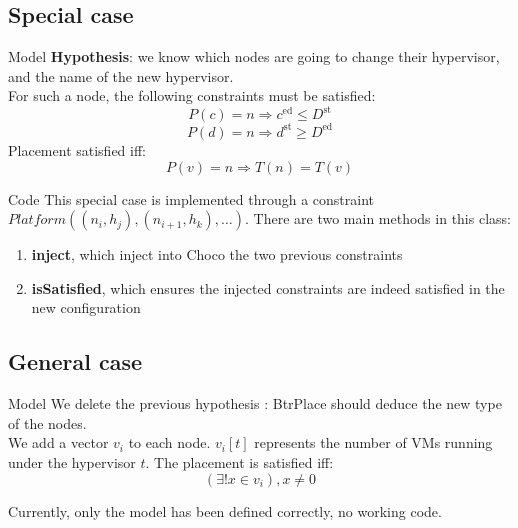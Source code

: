 \documentclass{beamer}
\begin{document}
\subsection{Special case}
\begin{frame}{Model}
\textbf{Hypothesis}: we know which nodes are going to change their hypervisor,
and the name of the new hypervisor.\\
\pause For such a node, the following constraints must be satisfied:
\[
	P(c) = n \Rightarrow c^\mathrm{ed} \leq D^\mathrm{st}
\]
\[
	P(d) = n \Rightarrow d^\mathrm{st} \geq D^\mathrm{ed}
\]
\pause Placement satisfied iff:
\[
	P(v) = n \Rightarrow T(n) = T(v)	
\]

\end{frame}
\begin{frame}{Code}
This special case is implemented through a constraint
$Platform((n_i, h_j), (n_{i+1}, h_k), \ldots)$.
There are two main methods in this class:
\begin{enumerate}
	\item{\textbf{inject}}, which inject into Choco the two previous
		constraints
	\item{\textbf{isSatisfied}}, which ensures the injected constraints
		are indeed satisfied in the new configuration
\end{enumerate}
\end{frame}

\subsection{General case}
\begin{frame}{Model}
We delete the previous hypothesis : BtrPlace should deduce the new
type of the nodes.\\
We add a vector $v_i$ to each node. $v_i[t]$ represents the number
of VMs running under the hypervisor $t$.
\pause The placement is satisfied iff:
\[
	(\exists ! x \in v_i), x \neq 0
\]

Currently, only the model has been defined correctly, no working code.
\end{frame}

\end{document}
